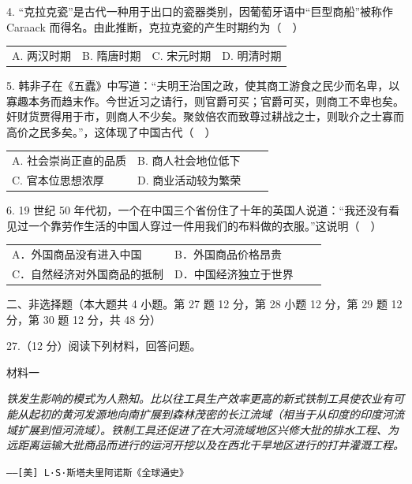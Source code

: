 \documentclass{ctexart}
\begin{document}
4. “克拉克瓷”是古代一种用于出口的瓷器类别，因葡萄牙语中“巨型商船”被称作 Caraack 而得名。由此推断，克拉克瓷的产生时期约为（　）

\begin{tabularx}{\linewidth}{XXXX}

A. 两汉时期 &
B. 隋唐时期 &
C. 宋元时期 &
D. 明清时期

\end{tabularx}

5. 韩非子在《五蠹》中写道：“夫明王治国之政，使其商工游食之民少而名卑，以寡趣本务而趋末作。今世近习之请行，则官爵可买；官爵可买，则商工不卑也矣。奸财货贾得用于市，则商人不少矣。聚敛倍农而致尊过耕战之士，则耿介之士寡而高价之民多矣。”，这体现了中国古代（　）

\begin{tabularx}{\linewidth}{XXXX}

A. 社会崇尚正直的品质 &
B. 商人社会地位低下 \\
C. 官本位思想浓厚 &
D. 商业活动较为繁荣

\end{tabularx}

6. 19 世纪 50 年代初，一个在中国三个省份住了十年的英国人说道：“我还没有看见过一个靠劳作生活的中国人穿过一件用我们的布料做的衣服。”这说明（　）

\begin{tabularx}{\linewidth}{XXXX}

A．外国商品没有进入中国 &
B．外国商品价格昂贵 \\
C．自然经济对外国商品的抵制 &
D．中国经济独立于世界

\end{tabularx}

\textsf{二、非选择题（本大题共 4 小题。第 27 题 12 分，第 28 小题 12 分，第 29 题 12 分，第 30 题 12 分，共 48 分）}

27.（12 分）阅读下列材料，回答问题。

\textsf{材料一}

\textit{铁发生影响的模式为人熟知。比以往工具生产效率更高的新式铁制工具使农业有可能从起初的黄河发源地向南扩展到森林茂密的长江流域（相当于从印度的印度河流域扩展到恒河流域）。铁制工具还促进了在大河流域地区兴修大批的排水工程、为远距离运输大批商品而进行的运河开挖以及在西北干旱地区进行的打井灌溉工程。}

\begin{flushright}

\texttt{——[美] L·S·斯塔夫里阿诺斯《全球通史》}

\end{flushright}
\end{document}
